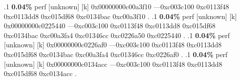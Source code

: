 \begin{profile}
{.1 \textbf{ 0.04\%} perf             [unknown]              [k] 0x00000000c00a3f10\newline {} ---0xc003c100\newline {} 0xc0113f48\newline {} 0xc0113dd8\newline {} 0xc015df68\newline {} 0xc0134bac\newline {} 0xc00a3f10\newline {} . 
.1 \textbf{ 0.04\%} perf             [unknown]              [k] 0x00000000c0225440\newline {} ---0xc003c100\newline {} 0xc0113f48\newline {} 0xc0113dd8\newline {} 0xc015df68\newline {} 0xc0134bac\newline {} 0xc00a3fa4\newline {} 0xc01346cc\newline {} 0xc0226a50\newline {} 0xc0225440\newline {} . 
.1 \textbf{ 0.04\%} perf             [unknown]              [k] 0x00000000c0226af0\newline {} ---0xc003c100\newline {} 0xc0113f48\newline {} 0xc0113dd8\newline {} 0xc015df68\newline {} 0xc0134bac\newline {} 0xc00a3fa4\newline {} 0xc01346cc\newline {} 0xc0226af0\newline {} . 
.1 \textbf{ 0.04\%} perf             [unknown]              [k] 0x00000000c0134acc\newline {} ---0xc003c100\newline {} 0xc0113f48\newline {} 0xc0113dd8\newline {} 0xc015df68\newline {} 0xc0134acc\newline {} . 
}
\end{profile}
